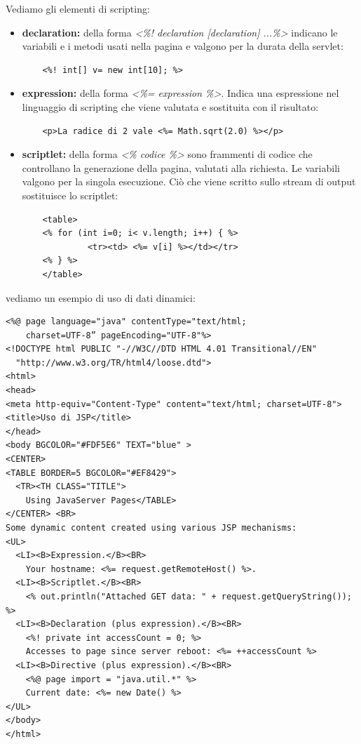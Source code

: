 \documentclass[a4paper,12pt, oneside]{book}
\begin{document}
Vediamo gli elementi di scripting:
\begin{itemize}
	\item \textbf{declaration:} della forma \textit{<\%! declaration [declaration] ...\%>} indicano le variabili e i metodi usati nella pagina e valgono per la durata della servlet:
	\begin{verbatim}
    <%! int[] v= new int[10]; %>
	\end{verbatim}
	\item \textbf{expression:} della forma \textit{<\%= expression \%>}. Indica una espressione nel linguaggio di scripting che viene valutata e sostituita con il risultato:
	\begin{verbatim}
    <p>La radice di 2 vale <%= Math.sqrt(2.0) %></p>
	\end{verbatim}
	\item \textbf{scriptlet:} della forma \textit{<\% codice \%>} sono frammenti di codice che controllano la generazione della pagina, valutati alla richiesta. Le variabili valgono per la singola esecuzione. Ciò che viene scritto sullo stream di output sostituisce lo scriptlet:
	\begin{verbatim}
    <table>
    <% for (int i=0; i< v.length; i++) { %>
             <tr><td> <%= v[i] %></td></tr>
    <% } %>
    </table>
	\end{verbatim}
\end{itemize}
vediamo un esempio di uso di dati dinamici:
\begin{verbatim}
<%@ page language="java" contentType="text/html;
    charset=UTF-8” pageEncoding="UTF-8"%>
<!DOCTYPE html PUBLIC "-//W3C//DTD HTML 4.01 Transitional//EN" 
  "http://www.w3.org/TR/html4/loose.dtd">
<html>
<head>
<meta http-equiv="Content-Type" content="text/html; charset=UTF-8">
<title>Uso di JSP</title>
</head>
<body BGCOLOR="#FDF5E6" TEXT="blue" >
<CENTER>
<TABLE BORDER=5 BGCOLOR="#EF8429">
  <TR><TH CLASS="TITLE">
    Using JavaServer Pages</TABLE>
</CENTER> <BR>
Some dynamic content created using various JSP mechanisms:
<UL>
  <LI><B>Expression.</B><BR>
    Your hostname: <%= request.getRemoteHost() %>.
  <LI><B>Scriptlet.</B><BR>
    <% out.println("Attached GET data: " + request.getQueryString()); %>
  <LI><B>Declaration (plus expression).</B><BR>
    <%! private int accessCount = 0; %>
    Accesses to page since server reboot: <%= ++accessCount %>
  <LI><B>Directive (plus expression).</B><BR>
    <%@ page import = "java.util.*" %>
    Current date: <%= new Date() %>
</UL>
</body>
</html>
\end{verbatim}
\end{document}
